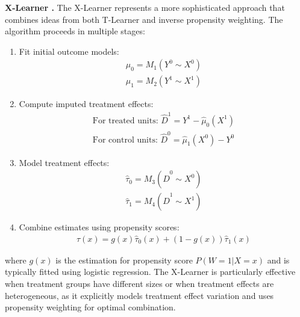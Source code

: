 \documentclass{article} %
\begin{document}
\textbf{X-Learner \citep{kunzel2019metalearners}.} The X-Learner represents a more sophisticated approach that combines ideas from both T-Learner and inverse propensity weighting. The algorithm proceeds in multiple stages:
\begin{enumerate}[leftmargin=20pt, itemsep=0pt,parsep=0pt,partopsep=0pt,topsep=0pt]
    \item Fit initial outcome models:
        \begin{align*}
            \hat{\mu}_0 = M_1(Y^0 \sim X^0)\\
            \hat{\mu}_1 = M_2(Y^1 \sim X^1)
        \end{align*}
    \item Compute imputed treatment effects:
        \begin{align*}
            \text{For treated units: } \hat{D}^1 = Y^1 - \hat{\mu}_0(X^1) \\
            \text{For control units: } \hat{D}^0 = \hat{\mu}_1(X^0) - Y^0
        \end{align*}
    \item Model treatment effects: 
        \begin{align*}
            \hat{\tau}_0 = M_3(\hat{D}^0 \sim X^0)\\ 
            \hat{\tau}_1 = M_4(\hat{D}^1 \sim X^1)
        \end{align*}
    \item Combine estimates using propensity scores: 
        \begin{align*}
            \hat{\tau}(x) = g(x)\hat{\tau}_0(x) + (1-g(x))\hat{\tau}_1(x)
        \end{align*}
\end{enumerate}
where $g(x)$ is the estimation for propensity score $P(W=1|X=x)$ and is typically fitted using logistic regression. The X-Learner is particularly effective when treatment groups have different sizes or when treatment effects are heterogeneous, as it explicitly models treatment effect variation and uses propensity weighting for optimal combination.
\end{document}
